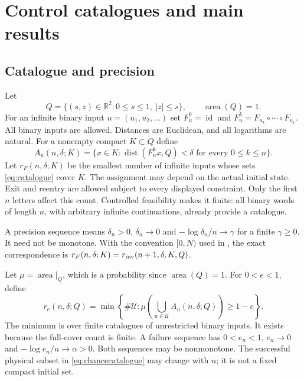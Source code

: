 \documentclass[11pt]{amsart}
\theoremstyle{definition}
\theoremstyle{remark}
\newcommand{\R}{\mathbb R}
\newcommand{\area}{\operatorname{area}}
\newcommand{\dist}{\operatorname{dist}}
\numberwithin{equation}{section}
\begin{document}
\section{Control catalogues and main results}\label{sec:planar}

\subsection{Catalogue and precision}
Let
\[
Q=\{(s,z)\in\R^2:0\le s\le1,\ |z|\le s\},\qquad \area(Q)=1.
\]
For an infinite binary input $u=(u_1,u_2,\ldots)$ set
$F_u^0=\operatorname{id}$ and
$F_u^k=F_{u_k}\circ\cdots\circ F_{u_1}$.
All binary inputs are
allowed. Distances are Euclidean, and all logarithms are natural.
For a nonempty compact $K\subset Q$ define
\begin{equation}\label{eq:catalogue}
A_u(n,\delta;K)=\{x\in K:\dist(F_u^kx,Q)<\delta
                    \text{ for every }0\le k\le n\}.
\end{equation}
Let $r_F(n,\delta;K)$ be the smallest number of infinite inputs
whose sets \eqref{eq:catalogue} cover $K$. The assignment may depend
on the actual initial state. Exit and reentry are allowed subject
to every displayed constraint. Only the first $n$ letters affect
this count. Controlled feasibility makes it finite: all binary
words of length $n$, with arbitrary infinite continuations,
already provide a catalogue.

A precision sequence means $\delta_n>0$, $\delta_n\to0$ and
$-\log\delta_n/n\to\gamma$ for a finite $\gamma\ge0$.
It need not be monotone. With the convention $[0,N)$ used in
\cite[Section 2.2]{CZ2024}, the exact correspondence is
$r_F(n,\delta;K)=r_{\rm inv}(n+1,\delta,K,Q)$.

Let $\mu=\area|_Q$, which is a probability since $\area(Q)=1$.
For $0<e<1$, define
\begin{equation}\label{eq:chancecatalogue}
r_e(n,\delta;Q)=\min\left\{\#\mathcal U:
\mu\left(\bigcup_{u\in\mathcal U}A_u(n,\delta;Q)\right)\ge1-e\right\}.
\end{equation}
The minimum is over finite catalogues of unrestricted binary inputs.
It exists because the full-cover count is finite.
A failure sequence has $0<e_n<1$, $e_n\to0$ and
$-\log e_n/n\to\alpha>0$. Both sequences may be nonmonotone.
The successful physical subset in \eqref{eq:chancecatalogue} may
change with $n$; it is not a fixed compact initial set.
\end{document}
